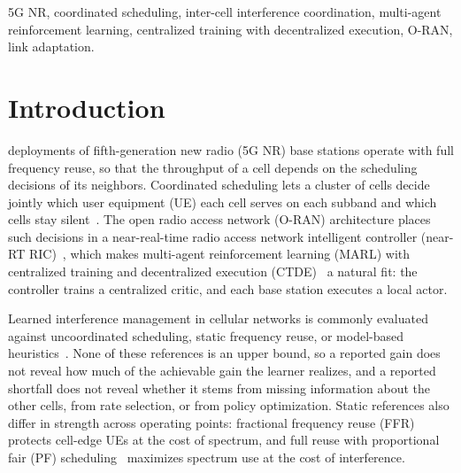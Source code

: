 \documentclass{ieeeaccess}
\begin{document}
\begin{keywords}
5G NR, coordinated scheduling, inter-cell interference coordination, multi-agent reinforcement learning, centralized training with decentralized execution, O-RAN, link adaptation.
\end{keywords}

\titlepgskip=-21pt

\maketitle

\section{Introduction}
\label{sec:introduction}
 deployments of fifth-generation new radio (5G NR) base stations operate with full frequency reuse, so that the throughput of a cell depends on the scheduling decisions of its neighbors. Coordinated scheduling lets a cluster of cells decide jointly which user equipment (UE) each cell serves on each subband and which cells stay silent~\cite{gesbert2010multicell,irmer2011comp,lee2012comp}. The open radio access network (O-RAN) architecture places such decisions in a near-real-time radio access network intelligent controller (near-RT RIC)~\cite{polese2023oran,bonati2021oran}, which makes multi-agent reinforcement learning (MARL) with centralized training and decentralized execution (CTDE)~\cite{lowe2017maddpg,foerster2018coma,yu2022mappo} a natural fit: the controller trains a centralized critic, and each base station executes a local actor.

Learned interference management in cellular networks is commonly evaluated against uncoordinated scheduling, static frequency reuse, or model-based heuristics~\cite{nasir2019power,naderializadeh2021resource}. None of these references is an upper bound, so a reported gain does not reveal how much of the achievable gain the learner realizes, and a reported shortfall does not reveal whether it stems from missing information about the other cells, from rate selection, or from policy optimization. Static references also differ in strength across operating points: fractional frequency reuse (FFR)~\cite{novlan2011ffr} protects cell-edge UEs at the cost of spectrum, and full reuse with proportional fair (PF) scheduling~\cite{viswanath2002pf} maximizes spectrum use at the cost of interference.
\end{document}
